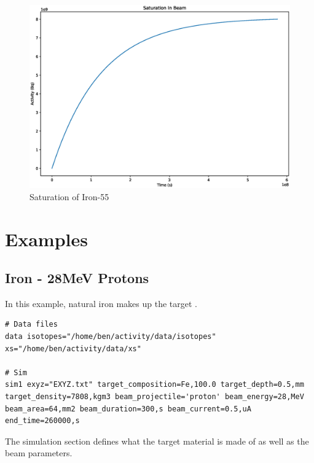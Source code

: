 \documentclass[12pt,twoside]{manual}
\begin{document}
\begin{figure}[h]
  \begin{center}
    \includegraphics[scale=0.25]{img/saturation_Fe55.eps}
  \end{center}
  \caption{Saturation of Iron-55}
\end{figure}


\FloatBarrier


\chapter{Examples}

\section{Iron - 28MeV Protons}

In this example, natural iron makes up the target . 

\begin{lstlisting}[style=inputfile, caption={}]
# Data files
data isotopes="/home/ben/activity/data/isotopes" xs="/home/ben/activity/data/xs"

# Sim
sim1 exyz="EXYZ.txt" target_composition=Fe,100.0 target_depth=0.5,mm target_density=7808,kgm3 beam_projectile='proton' beam_energy=28,MeV beam_area=64,mm2 beam_duration=300,s beam_current=0.5,uA end_time=260000,s
\end{lstlisting}

The simulation section defines what the target material is made of as well as the beam parameters.  
\end{document}
